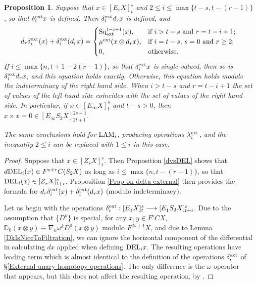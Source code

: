 \documentclass[11pt]{amsart} \renewcommand{\baselinestretch}{1.2}
\theoremstyle{plain}
\newtheorem{prop}[thm]{Proposition}
\numberwithin{equation}{section} %
\theoremstyle{plain}
\newtheorem{prop}[thm]{Proposition}
\numberwithin{equation}{chapter} %
\renewcommand{\to}{\longrightarrow}
\newcommand{\twist}{\omega}
\newcommand{\Sq}{\mathrm{Sq}}
\newcommand{\E}[5]{[E^{#1}_{#2}#3]^{#4}_{#5}}
\newcommand{\Edownup}[5]{[E_{#1}^{#2}#3]^{#4}_{#5}}
\newcommand{\EZdownup}[5]{[Z^{#2}_{#1}#3]^{#4}_{#5}}
\begin{document}
\begin{second quadrant homotopy sseq operations}
\begin{prop}
Suppose that $x\in \E{}{r}{X}{s}{t}$ and $2\leq i\leq \max\{t-s,t-(r-1)\}$, so that $\delta^\textup{ext}_ix $ is defined. Then $\delta^\textup{ext}_i d_r x$ is defined, and 
\[d_r\delta^\textup{ext}_i(x)+ \delta^\textup{ext}_i(d_rx)=\begin{cases}
\Sq_\textup{ext}^{t-i+1}(x),&\textup{if $i>t-s$ and $r =t-i+1$};\\
\mu^\textup{ext}(x\otimes d_rx),&\textup{if $i=t-s$,  $s=0$ and $r\geq2$};\\
0,&\textup{otherwise.}
\end{cases}\]
If $i\leq \max\{n,t+1-2(r-1)\}$, so that $\delta^\textup{ext}_i x$ is single-valued, then so is $\delta^\textup{ext}_i d_r x$, and this equation holds exactly. Otherwise, this equation holds modulo the indeterminacy of the right hand side. When $i>t-s$ and $r =t-i+1$ the set of values of the left hand side coincides with the set of values of the right hand side.  In particular, if $x\in \E{}{\infty}{X}{s}{t}$ and $t-s>0$, then $x\times x=0\in\E{}{\infty}{S_2X}{2s+1}{2t+1}$.

The same conclusions hold for $\textup{LAM}_i$, producing operations $\lambda_i^\textup{ext}$, and the inequality $2\leq i$ can be replaced with $1\leq i$ in this case.
\end{prop}
\begin{proof}
Suppose that $x\in \EZdownup{r}{}{X}{s}{t}$. Then Proposition \ref{dvsDEL} shows that $d\textup{DEL}_i(x)\in F^{s+r}C(S_2X)$ as long as $i\leq \max\{n,t-(r-1)\}$, so that $\textup{DEL}_i(x)\in \EZdownup{r}{}{X}{s}{t+i}$. 
Proposition \ref{Prop on delta external} then provides the formula for 
$d_r\delta^\textup{ext}_i(x)+ \delta^\textup{ext}_i(d_rx)$ (modulo indeterminacy).

Let us begin with the operations $\delta^\textup{ext}_i:\Edownup{1}{}{X}{s}{t}\to \Edownup{1}{}{S_2X}{s}{t+i}$. Due to the assumption that $\{D^k\}$ is special, for any $x,y\in F^{s}CX$, $\mathbb{D}_k(x\otimes  y)\equiv \nabla_k\twist^k D^0(x\otimes y) $ modulo $F^{2s+1}X$, and due to Lemma \ref{DkIsNiceToFiltration}, we can ignore the horizontal component of the differential in calculating $dx$ applied when defining $\textup{DEL}_ix$. The resulting operations have leading term which is almost identical to the definition of the operations $\delta_i^\textup{ext}$ of \S\ref{External unary homotopy operations}. The only difference is the $\twist$ operator that appears, but this does not affect the resulting operation, by \cite[Lemma 4.1]{DwyerHtpyOpsSimpComAlg.pdf}.


\end{proof}
\end{second quadrant homotopy sseq operations}
\end{document}
